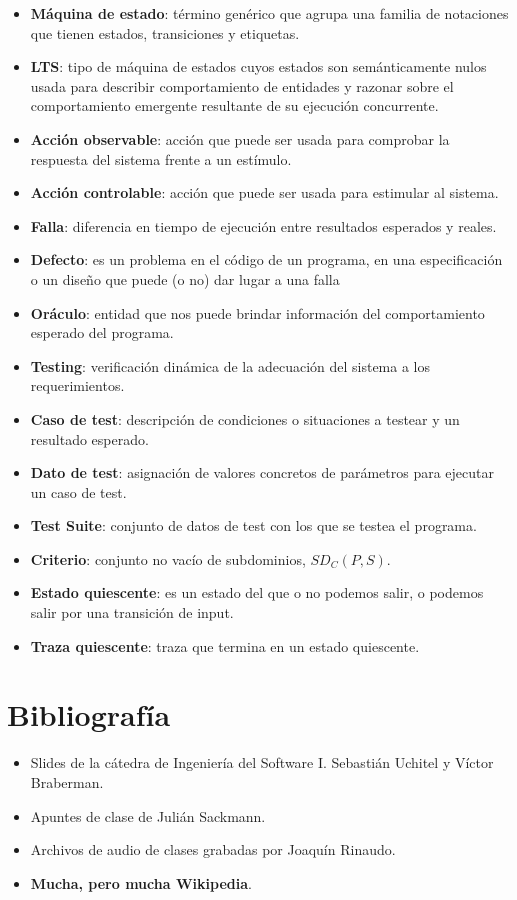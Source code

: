 \documentclass[]{article}
\begin{document}
\begin{itemize}
	\item \textbf{Máquina de estado}: término genérico que agrupa una familia de notaciones que tienen estados, transiciones y etiquetas.
	\item \textbf{LTS}: tipo de máquina de estados cuyos estados son semánticamente nulos usada para describir comportamiento de entidades y razonar sobre el comportamiento emergente resultante de su ejecución concurrente.

	\item \textbf{Acción observable}: acción que puede ser usada para comprobar la respuesta del sistema frente a un estímulo.

	\item \textbf{Acción controlable}: acción que puede ser usada para estimular al sistema.

	\item \textbf{Falla}: diferencia en tiempo de ejecución entre resultados esperados y reales.
	\item \textbf{Defecto}: es un problema en el código de un programa, en una especificación o un diseño que puede (o no) dar lugar a una falla

	\item \textbf{Oráculo}: entidad que nos puede brindar información del comportamiento esperado del programa.
	\item \textbf{Testing}: verificación dinámica de la adecuación del sistema a los requerimientos.
	\item \textbf{Caso de test}: descripción de condiciones o situaciones a testear y un resultado esperado.
	\item \textbf{Dato de test}: asignación de valores concretos de parámetros para ejecutar un caso de test.
	\item \textbf{Test Suite}: conjunto de datos de test con los que se testea el programa.
	\item \textbf{Criterio}: conjunto no vacío de subdominios, $SD_C (P,S)$.
	\item \textbf{Estado quiescente}: es un estado del que o no podemos salir, o podemos salir por una transición de input.
	\item \textbf{Traza quiescente}: traza que termina en un estado quiescente.


\end{itemize}

\newpage

\section{Bibliografía}
\begin{itemize}
	\item Slides de la cátedra de Ingeniería del Software I. Sebastián Uchitel y Víctor Braberman.
	\item Apuntes de clase de Julián Sackmann.
	\item Archivos de audio de clases grabadas por Joaquín Rinaudo.
	\item \textbf{Mucha, pero mucha Wikipedia}.
\end{itemize}
\end{document}
